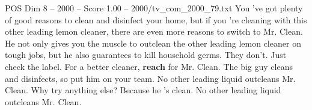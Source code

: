\begin{textsample}{POS Dim 8 – 2000 – Score 1.00 – 2000/tv\_com\_2000\_79.txt}  \label{ex:f8_pos_037}
You 've got plenty of good reasons to clean and disinfect your home, but if you 're cleaning with this other leading lemon cleaner, there are even more reasons to switch to Mr.
Clean.
He not only gives you the muscle to outclean the other leading lemon cleaner on tough jobs, but he also guarantees to kill household germs.
They don't.
Just check the label.
For a better cleaner, \textbf{reach} for Mr.
Clean.
The big guy cleans and disinfects, so put him on your team.
No other leading liquid outcleans Mr.
Clean.
Why try anything else?
Because he 's clean.
No other leading liquid outcleans Mr.
Clean.

\end{textsample}
